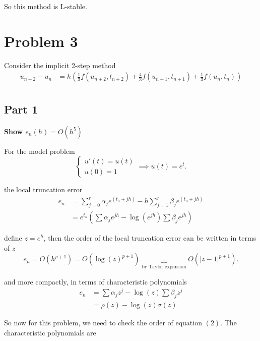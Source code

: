 \documentclass[12pt,a4paper]{article}
\begin{document}
So this method is L-stable.

\section{Problem 3}%
\label{sec:problem_3}

\par Consider the implicit 2-step method
\begin{align*}
  u_{n+2} - u_{n} &= h \left(\frac{1}{3}f(u_{n+2},t_{n+2})
  + \frac{4}{3}f(u_{n+1},t_{n+1}) + \frac{1}{3}f(u_{n},t_{n})\right) \\
\end{align*}

\subsection{Part 1}%
\label{sub:part_1}

\par \textbf{Show $e_n(h) = O(h^5)$}  

\par For the model problem 
\[
   \begin{cases}
     u'(t) = u(t) \\
     u(0) = 1
   \end{cases} \implies u(t) = e^{ t}
.\] 

\par the local truncation error 
\begin{align*}
  e_{n} &= \sum^{r}_{j=0} \alpha_{j}e^{ (t_{n}+jh)} - 
  h \sum^{r}_{j=1} \beta_{j}e^{ (t_{n}+jh)} \\
        &= e^{ t_{n}} \left( \sum \alpha_j e^{ jh} - \log(e^{jh})
        \sum \beta_j e^{ jh}\right)
\end{align*}

\par define $ z = e^{ h}$, then the order of the local truncation error
can be written in terms of $ z$
\[
  e_{n} = O(h^{p+1}) = O(\log( z)^{p+1}) \underbrace{=}_{\text{by Taylor
  expansion}} O( | z-1|^{p+1})
 .\] 


\par and more compactly, in terms of characteristic polynomials
 \begin{align}
   e_{n} &= \sum \alpha_j z^{j} - \log( z) \sum \beta_j z^{j} \\
         &= \rho( z) - \log( z) \sigma( z)
 \end{align}

 So now for this problem, we need to check the order of equation $(2)$. The
 characteristic polynomials are
\end{document}
